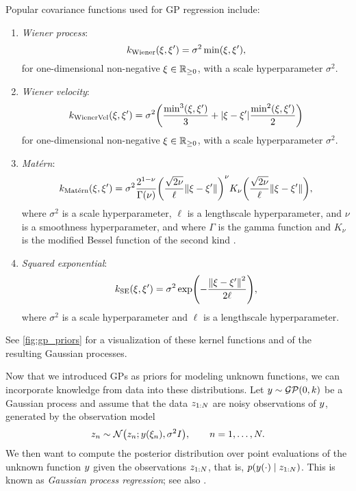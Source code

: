 \documentclass{mimosis}
\begin{document}
\begin{exmple}
\label{example:gp-kernels}
Popular covariance functions used for GP regression include:
\begin{enumerate}
\item \emph{Wiener process}:
\begin{equation}
k_\text{Wiener}(\xi, \xi') = \sigma^2 \min(\xi, \xi'),
\end{equation}
for one-dimensional non-negative \(\xi \in \mathbb{R}_{\geq0}\), with a scale hyperparameter \(\sigma^2\).
\item \emph{Wiener velocity}:
\begin{equation}
\gpcovfun_\text{WienerVel}(\xi, \xi') = \sigma^2 \left(
  \frac{\min^3(\xi, \xi')}{3} + \abs{\xi - \xi'} \frac{\min^2(\xi, \xi')}{2}
\right)
\end{equation}
for one-dimensional non-negative \(\xi \in \mathbb{R}_{\geq0}\), with a scale hyperparameter \(\sigma^2\).
\item \emph{Matérn}:
\begin{equation}
\gpcovfun_\text{Mat\'ern}(\xi, \xi') = \sigma^2 \frac{2^{1-\nu}}{\Gamma(\nu)} \left( \frac{\sqrt{2\nu}}{\ell} \norm{\xi - \xi'} \right)^\nu K_\nu\left( \frac{\sqrt{2\nu}}{\ell} \norm{\xi - \xi'} \right),
\end{equation}
where \(\sigma^2\) is a scale hyperparameter, \(\ell\) is a lengthscale hyperparameter, and \(\nu\) is a smoothness hyperparameter,
and where \(\Gamma\) is the gamma function and \(K_\nu\) is the modified Bessel function of the second kind \parencite{rasmussen2005gpml}.
\item \emph{Squared exponential}:
\begin{equation}
k_\text{SE}(\xi, \xi') = \sigma^2 \exp( -\frac{\norm{\xi - \xi'}^2}{2 \ell} ),
\end{equation}
where \(\sigma^2\) is a scale hyperparameter and \(\ell\) is a lengthscale hyperparameter.
\end{enumerate}
See \cref{fig:gp_priors} for a visualization of these kernel functions and of the resulting Gaussian processes.
\end{exmple}

Now that we introduced GPs as priors for modeling unknown functions, we can incorporate knowledge from data into these distributions.
Let
\(\sval \sim \GP(0, \gpcovfun)\) be a Gaussian process and assume that
the data \(z_{1:N}\) are noisy observations of \(y\),
generated by the observation model
\begin{equation}
  \label{eq:gmr:obs-model}
  \sobs_\idxt \sim \N( \sobs_\idxt; \sval(\xi_\idxt), \sigma^2 \eye ), \qquad \idxt = 1, \dots, N.
\end{equation}
We then want to compute the posterior distribution over point evaluations of the unknown function
\(y\)
given the observations \(z_{1:N}\),
that is,
\(\p(\sval(\cdot) \mid \sobs_{1:N})\).
This is known as \emph{Gaussian process regression}; see also
\textcite[Section 2.2]{rasmussen2005gpml}.
\end{document}
